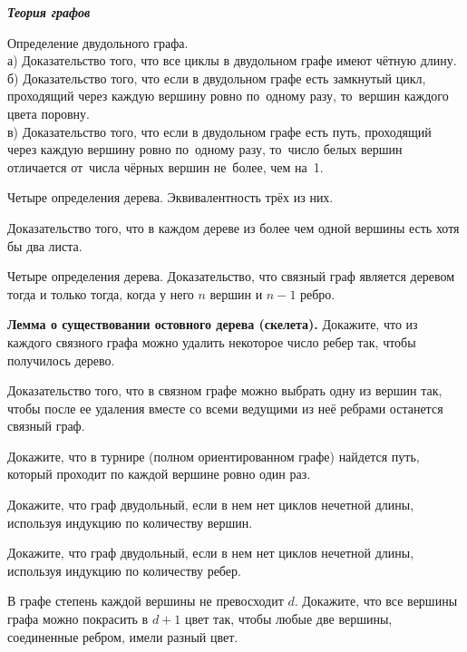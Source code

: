 \begin{center}
\textbf{\textit{Теория графов}}
\end{center}
\begin{problems}
\item Определение двудольного графа.\\ а) Доказательство того, что все циклы в двудольном графе имеют чётную длину.\\ 
б) Доказательство того, что если в двудольном графе есть замкнутый цикл, проходящий через каждую вершину ровно по~одному разу, то~вершин каждого цвета поровну.\\ 
в) Доказательство того, что если в двудольном графе есть путь, проходящий через каждую вершину ровно по~одному разу, то~число белых вершин отличается от~числа чёрных вершин не~более, чем на~1.

\item Четыре определения дерева. Эквивалентность трёх из них.

\item Доказательство того, что в каждом дереве из более чем одной вершины есть хотя бы два листа.

\item Четыре определения дерева. Доказательство, что связный граф является деревом тогда и только тогда, когда у него $n$ вершин и $n-1$ ребро.

\item \textbf{Лемма о существовании остовного дерева (скелета).} Докажите, что из каждого связного графа можно удалить некоторое число ребер так, чтобы получилось дерево. 

\item Доказательство того, что в связном графе можно выбрать одну из вершин так, чтобы после ее
удаления вместе со всеми ведущими из неё ребрами останется связный граф.

\item Докажите, что в турнире (полном ориентированном графе) найдется путь, который проходит по каждой вершине ровно один раз. 

\item Докажите, что граф двудольный, если в нем нет циклов нечетной длины, используя индукцию по количеству вершин.

\item Докажите, что граф двудольный, если в нем нет циклов нечетной длины, используя индукцию по количеству ребер.

\item В графе степень каждой вершины не превосходит $d$. Докажите, что все вершины графа можно покрасить в $d + 1$ цвет так, чтобы любые две вершины, соединенные ребром, имели разный цвет. 

\end{problems}

